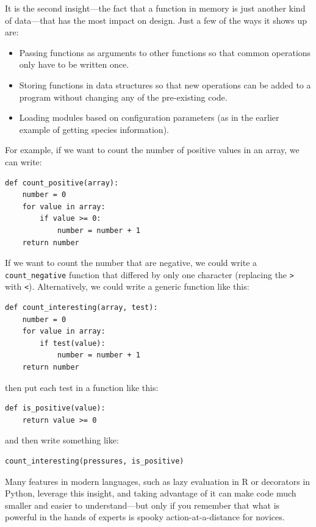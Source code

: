 \documentclass[10pt,letterpaper]{article}
\begin{document}
It is the second insight---the fact that
a function in memory is just another kind of data---that has the most impact on design.
Just a few of the ways it shows up are:

\begin{itemize}
\item
  Passing functions as arguments to other functions
  so that common operations only have to be written once.
\item
  Storing functions in data structures
  so that new operations can be added to a program
  without changing any of the pre-existing code.
\item
  Loading modules based on configuration parameters
  (as in the earlier example of getting species information).
\end{itemize}

For example,
if we want to count the number of positive values in an array,
we can write:

\begin{verbatim}
def count_positive(array):
    number = 0
    for value in array:
        if value >= 0:
            number = number + 1
    return number
\end{verbatim}

If we want to count the number that are negative,
we could write a \texttt{count\_negative} function that differed by only one character
(replacing the \texttt{>} with \texttt{<}).
Alternatively,
we could write a generic function like this:

\begin{verbatim}
def count_interesting(array, test):
    number = 0
    for value in array:
        if test(value):
            number = number + 1
    return number
\end{verbatim}

\noindent
then put each test in a function like this:

\begin{verbatim}
def is_positive(value):
    return value >= 0
\end{verbatim}

\noindent
and then write something like:

\begin{verbatim}
count_interesting(pressures, is_positive)
\end{verbatim}

Many features in modern languages,
such as lazy evaluation in R or decorators in Python,
leverage this insight,
and taking advantage of it can make code much smaller
and easier to understand---but only if you remember that
what is powerful in the hands of experts is spooky action-at-a-distance for novices.
\end{document}
